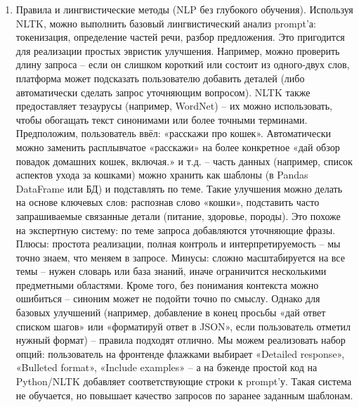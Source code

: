 \begin{enumerate}[label=\arabic*.]

\item Правила и лингвистические методы (NLP без глубокого обучения). Используя NLTK, можно выполнить базовый лингвистический анализ prompt’а: токенизация, определение частей речи, разбор предложения. Это пригодится для реализации простых эвристик улучшения. Например, можно проверить длину запроса – если он слишком короткий или состоит из одного-двух слов, платформа может подсказать пользователю добавить деталей (либо автоматически сделать запрос уточняющим вопросом). NLTK также предоставляет тезаурусы (например, WordNet) – их можно использовать, чтобы обогащать текст синонимами или более точными терминами. Предположим, пользователь ввёл: «расскажи про кошек». Автоматически можно заменить расплывчатое «расскажи» на более конкретное «дай обзор повадок домашних кошек, включая.» и т.д. – часть данных (например, список аспектов ухода за кошками) можно хранить как шаблоны (в Pandas DataFrame или БД) и подставлять по теме. Такие улучшения можно делать на основе ключевых слов: распознав слово «кошки», подставить часто запрашиваемые связанные детали (питание, здоровье, породы). Это похоже на экспертную систему: по теме запроса добавляются уточняющие фразы. Плюсы: простота реализации, полная контроль и интерпретируемость – мы точно знаем, что меняем в запросе. Минусы: сложно масштабируется на все темы – нужен словарь или база знаний, иначе ограничится несколькими предметными областями. Кроме того, без понимания контекста можно ошибиться – синоним может не подойти точно по смыслу. Однако для базовых улучшений (например, добавление в конец просьбы «дай ответ списком шагов» или «форматируй ответ в JSON», если пользователь отметил нужный формат) – правила подходят отлично. Мы можем реализовать набор опций: пользователь на фронтенде флажками выбирает «Detailed response», «Bulleted format», «Include examples» – а на бэкенде простой код на Python/NLTK добавляет соответствующие строки к prompt’у. Такая система не обучается, но повышает качество запросов по заранее заданным шаблонам.


\end{enumerate}
